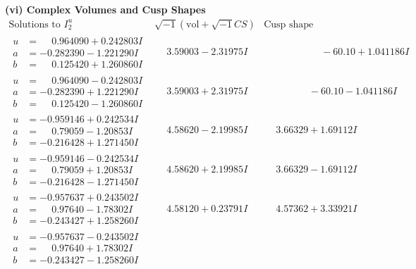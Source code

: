 \documentclass[1p]{elsarticle_modified}
\theoremstyle{definition}
\newcommand{\I}{\sqrt{-1}}
\begin{document}
\newpage\flushleft \textbf{(vi) Complex Volumes and Cusp Shapes}
$$\begin{array}{c|c|c}  
\text{Solutions to }I^u_{2}& \I (\text{vol} + \sqrt{-1}CS) & \text{Cusp shape}\\
 \hline 
\begin{aligned}
u &= \phantom{-}0.964090 + 0.242803 I \\
a &= -0.282390 - 1.221290 I \\
b &= \phantom{-}0.125420 + 1.260860 I\end{aligned}
 & \phantom{-}3.59003 - 2.31975 I & \phantom{-0.000000 -}     -6
0. 10   + 1.041186 I \\ \hline\begin{aligned}
u &= \phantom{-}0.964090 - 0.242803 I \\
a &= -0.282390 + 1.221290 I \\
b &= \phantom{-}0.125420 - 1.260860 I\end{aligned}
 & \phantom{-}3.59003 + 2.31975 I & \phantom{-0.000000 }      -6
0. 10   - 1.041186 I \\ \hline\begin{aligned}
u &= -0.959146 + 0.242534 I \\
a &= \phantom{-}0.79059 - 1.20853 I \\
b &= -0.216428 + 1.271450 I\end{aligned}
 & \phantom{-}4.58620 - 2.19985 I & \phantom{-}3.66329 + 1.69112 I \\ \hline\begin{aligned}
u &= -0.959146 - 0.242534 I \\
a &= \phantom{-}0.79059 + 1.20853 I \\
b &= -0.216428 - 1.271450 I\end{aligned}
 & \phantom{-}4.58620 + 2.19985 I & \phantom{-}3.66329 - 1.69112 I \\ \hline\begin{aligned}
u &= -0.957637 + 0.243502 I \\
a &= \phantom{-}0.97640 - 1.78302 I \\
b &= -0.243427 + 1.258260 I\end{aligned}
 & \phantom{-}4.58120 + 0.23791 I & \phantom{-}4.57362 + 3.33921 I \\ \hline\begin{aligned}
u &= -0.957637 - 0.243502 I \\
a &= \phantom{-}0.97640 + 1.78302 I \\
b &= -0.243427 - 1.258260 I\end{aligned}

\end{array}$$
\end{document}
